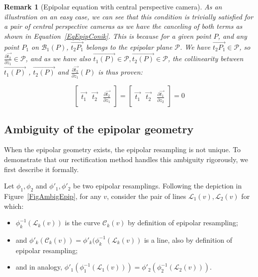 \documentclass{ipol}
\newcommand{\Bund}[1]{\ensuremath{\mathcal{B}_{#1}}}
\newcommand{\BundO}{\Bund{1}}
\newcommand{\LineE}[1]{\ensuremath{\mathcal{L}_{#1}}}
\newcommand{\LineO}{\LineE{1}}
\newcommand{\LineT}{\LineE{2}}
\newcommand{\LineK}{\LineE{k}}
\newcommand{\CurveE}[1]{\ensuremath{\mathcal{C}_{#1}}}
\newcommand{\CurveK}{\CurveE{k}}
\newcommand{\BigV}[1]{\ensuremath{\overrightarrow{#1}}}
\newcommand{\TanO}[1]{\BigV{t_1#1}}
\newcommand{\TanT}[1]{\BigV{t_2#1}}
\newcommand{\DerPart}[2]{\frac{\partial #1}{\partial #2}}
\newtheorem{remark}{Remark}
\begin{document}
\begin{remark}[Epipolar equation with central perspective camera]
As an illustration on an easy case, we can see that this condition is trivially 
satisfied for a pair of central perspective cameras as we have the canceling of both terms as shown
in Equation~\eqref{EqEpipConik}. This is because for a given point $P$,
and any point $P_1$ on $\BundO(P)$, $\TanT{P_1}$ belongs to the epipolar
plane $\mathcal{P}$. We have $\TanT{P_1} \in \mathcal{P}$, so $\DerPart { \TanT{}}{z_1} \in \mathcal{P}$,
and as we have also $\TanO{(P)} \in  \mathcal{P}, \TanT{(P)} \in  \mathcal{P}$, the collinearity
between $\TanO{(P)}$ , $\TanT{(P)}$ and $\DerPart { \TanT{}}{z_1}(P)$ is thus proven:

\begin{equation}
\left[ \begin{array}{c|c|c}
\TanO{} & \TanT{}  & \DerPart { \TanT{}}{z_1}  
\end{array} \right]  
=\left[ \begin{array}{c|c|c}
\TanO{} & \TanT{}  & \DerPart { \TanO{}}{z_2}  
\end{array} \right]  
=0
\label{EqEpipConik}
\end{equation}
\end{remark}




\subsection{Ambiguity of the epipolar geometry}

When the epipolar geometry exists, the epipolar resampling is not unique. To demonstrate that our rectification method handles this ambiguity rigorously, we first describe it formally.


Let $\phi_1,\phi_2$ and  $\phi'_1,\phi'_2$ be two epipolar resamplings. Following the depiction in Figure~\ref{FigAmbigEpip}, for any $v$, consider the pair of lines $\LineO(v),\LineT(v)$ for which:

\begin{itemize}
   \item  $\phi_k^{-1}(\LineK(v))$ is the curve $\CurveK(v)$ by definition of epipolar resampling;
   \item  and $\phi'_k (\CurveK(v)) = \phi'_k ( \phi_k^{-1}(\LineK(v))$ is a line, also by definition of epipolar resampling;
   \item and in analogy, $\phi'_1 ( \phi_1^{-1}(\LineO(v))) = \phi'_2 ( \phi_2^{-1}(\LineT(v)))$.
\end{itemize}
\end{document}
